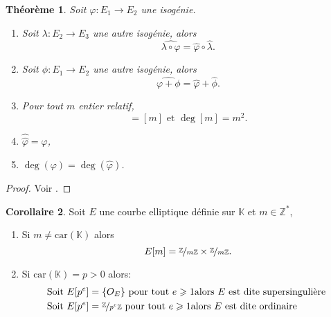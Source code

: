 \documentclass[10pt,a4paper]{book}
\theoremstyle{plain}
\newtheorem{thm}{Théorème}[chapter]
\theoremstyle{definition}
\theoremstyle{definition}
\newtheorem{cor}[thm]{Corollaire}
\theoremstyle{definition}
\theoremstyle{definition}
\theoremstyle{remark}
\theoremstyle{remark}
\theoremstyle{definition}
\begin{document}
\begin{thm}
Soit $\varphi:E_1 \rightarrow E_2$ une isogénie.
\begin{enumerate}
\item Soit $\lambda:E_2 \rightarrow E_3$ une autre isogénie, alors
\begin{equation*}
\widehat{\lambda \circ \varphi}= \widehat{\varphi} \circ \widehat{\lambda}.
\end{equation*} 
\item Soit $\phi:E_1 \rightarrow E_2$ une autre isogénie, alors
\begin{equation*}
\widehat{\varphi+\phi}=\widehat{\varphi}+\widehat{\phi}.
\end{equation*}
\item Pour tout $m$ entier relatif,
\begin{equation*}
[\widehat{m}]=[m] \text{ et } \deg[m]=m^2.
\end{equation*}
\item $\widehat{\widehat{\varphi}}=\varphi$,
\item $\deg(\varphi)=\deg(\widehat{\varphi})$.
\end{enumerate}
 
\end{thm}

\begin{proof}
Voir \cite[Theorem III.6.2]{Silv1}.
\end{proof}

\begin{cor}
Soit $E$ une courbe elliptique définie sur $\mathbb{K}$ et $m \in \mathbb{Z}^*$,
\begin{enumerate}
\item Si $m \neq \mathrm{car}(\mathbb{K})$ alors
\begin{equation*}
E[m]=\nicefrac{\mathbb{Z}}{m\mathbb{Z}} \times \nicefrac{\mathbb{Z}}{m\mathbb{Z}}. 
\end{equation*}
\item Si $\mathrm{car}(\mathbb{K})=p>0$ alors:
\begin{equation*}
\begin{alignedat}{1}
&\text{Soit } E[p^e]=\{O_E\} \text{ pour tout } e \geqslant 1 \text{alors $E$ est dite supersingulière }\\
&\text{Soit } E[p^e]=\nicefrac{\mathbb{Z}}{p^e\mathbb{Z}} \text{ pour tout } e \geqslant 1
\text{alors $E$ est dite ordinaire }\end{alignedat}
\end{equation*}
\end{enumerate}
\end{cor}
\end{document}
